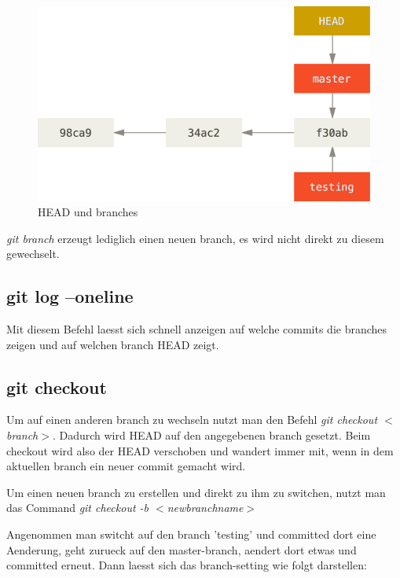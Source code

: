 \documentclass{article}
\begin{document}
\begin{figure}[h!]
    \centering
    \includegraphics[width=\textwidth]{../bilder/head.png}
    \caption{HEAD und branches}
    \label{head}
\end{figure} 

\textit{git branch} erzeugt lediglich einen neuen branch, es wird nicht direkt zu diesem gewechselt.

\subsection*{git log --oneline}
Mit diesem Befehl laesst sich schnell anzeigen auf welche commits die branches zeigen und auf welchen branch HEAD zeigt.
   
\subsection*{git checkout}
Um auf einen anderen branch zu wechseln nutzt man den Befehl \textit{git checkout $<$branch$>$}. Dadurch wird HEAD auf den angegebenen branch gesetzt. Beim checkout wird also der HEAD verschoben und wandert immer mit, wenn in dem aktuellen branch ein neuer commit gemacht wird.

Um einen neuen branch zu erstellen und direkt zu ihm zu switchen, nutzt man das Command \textit{git checkout -b $<$newbranchname$>$}

Angenommen man switcht auf den branch 'testing' und committed dort eine Aenderung, geht zurueck auf den master-branch, aendert dort etwas und committed erneut. Dann laesst sich das branch-setting wie folgt darstellen:
\end{document}
